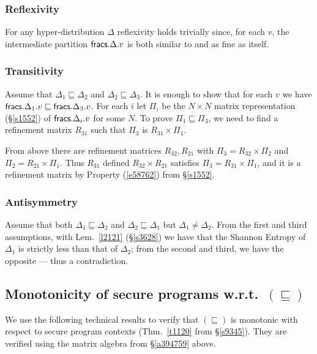 \documentclass[runningheads]{llncs}
\newcommand\Sec[1] {Sec.~\ref{#1}}
\newcommand\App[1] {App.~\ref{#1}}
\renewcommand\Sec[1] {\S\ref{#1}}
\renewcommand\App[1] {\S\ref{#1}}
\newcommand\Eqn[1] {(\ref{#1})}
\newcommand\Ref {\mathrel{\sqsubseteq}}
\newcommand\Thm[1] {Thm.~\ref{#1}}
\newcommand\Lem[1] {Lem.~\ref{#1}}
\begin{document}
\subsubsection{Reflexivity} For any hyper-distribution $\Delta$ reflexivity holds trivially since, for each $v$, the intermediate partition $\textsf{fracs}.\Delta.v$ is both similar to and as fine as itself.

\subsubsection{Transitivity} Assume that $\Delta_1{\Ref}\Delta_2$ and $\Delta_2{\Ref}\Delta_3$. It is enough to show that for each $v$ we have $\Fracs.\Delta_1.v\Ref\Fracs.\Delta_3.v$.
For each $i$ let $\Pi_{i}$ be the $N{\times}N$ matrix representation (\Sec{s1552}) of $\textsf{fracs}.\Delta_i.v$ for some $N$.
To prove $\Pi_1{\Ref}\Pi_3$, we need to find a refinement matrix $R_{31}$ such that $\Pi_3$ is $R_{31}{\times}\Pi_{1}$.

From above there are refinement matrices $R_{32},R_{21}$ with $\Pi_3 = R_{32} {\times} \Pi_2$ and $\Pi_2 = R_{21} {\times} \Pi_1$. Thus $R_{31}$ defined $R_{32} {\times} R_{21}$ satisfies $\Pi_3 = R_{31} {\times} \Pi_1$, and it is a refinement matrix by Property \Eqn{e58762} from \Sec{s1552}.

\subsubsection{Antisymmetry}

Assume that both $\Delta_1{\Ref}\Delta_2$ and $\Delta_2{\Ref}\Delta_1$ but $\Delta_1 \neq \Delta_2$. From the first and third assumptions, with \Lem{l2121} (\App{s3628}) we have that the Shannon Entropy 
of $\Delta_1$ is strictly less than that of $\Delta_2$; from the second and third, we have the opposite --- thus a contradiction.


\subsection{Monotonicity of secure programs w.r.t.\ $(\Ref)$} \label{a9475}

We use the following technical results to verify that $(\Ref)$ is monotonic with respect to secure program contexts (\Thm{t1120} from \Sec{s9345}). They are verified using the matrix algebra from \App{a394759} above.
\end{document}
